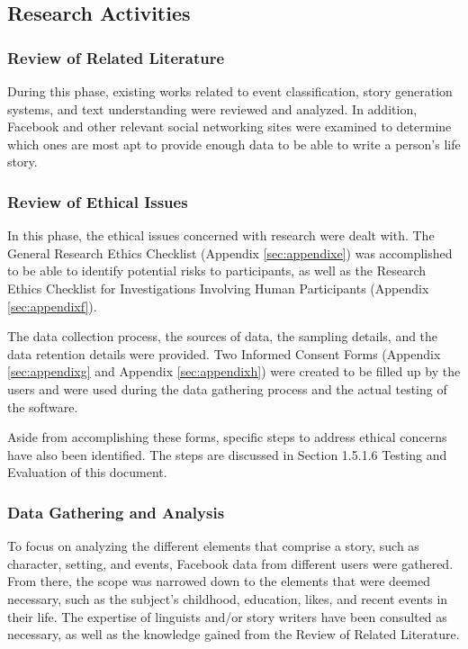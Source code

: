 \subsection{Research Activities}

\subsubsection{Review of Related Literature}
During this phase, existing works related to event classification, story generation systems, and text understanding were reviewed and analyzed. In addition, Facebook and other relevant social networking sites were examined to determine which ones are most apt to provide enough data to be able to write a person's life story. 

\subsubsection{Review of Ethical Issues}
In this phase, the ethical issues concerned with research were dealt with. The General Research Ethics Checklist (Appendix \ref{sec:appendixe}) was accomplished to be able to identify potential risks to participants, as well as the Research Ethics Checklist for Investigations Involving Human Participants (Appendix \ref{sec:appendixf}).

The data collection process, the sources of data, the sampling details, and the data retention details were provided. Two Informed Consent Forms (Appendix \ref{sec:appendixg} and Appendix \ref{sec:appendixh}) were created to be filled up by the users and were used during the data gathering process and the actual testing of the software.

Aside from accomplishing these forms, specific steps to address ethical concerns have also been identified. The steps are discussed in Section 1.5.1.6 Testing and Evaluation of this document.

\subsubsection{Data Gathering and Analysis}
To focus on analyzing the different elements that comprise a story, such as character, setting, and events, Facebook data from different users were gathered. From there, the scope was narrowed down to the elements that were deemed necessary, such as the subject's childhood, education, likes, and recent events in their life. The expertise of linguists and/or story writers have been consulted as necessary, as well as the knowledge gained from the Review of Related Literature.

